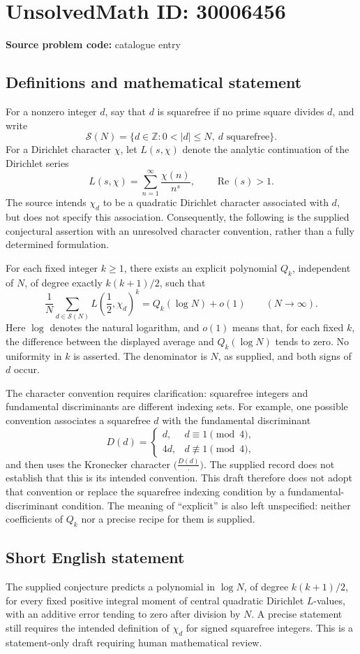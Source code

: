 \documentclass[11pt]{article}
\newcommand{\Z}{\mathbb{Z}}
\begin{document}
\section*{UnsolvedMath ID: 30006456}
\textbf{Source problem code:} catalogue entry
\subsection{Definitions and mathematical statement}
For a nonzero integer \(d\), say that \(d\) is squarefree if no prime square divides \(d\), and write
\[
\mathcal S(N)=\{d\in\Z:0<|d|\leq N,\ d\text{ squarefree}\}.
\]
For a Dirichlet character \(\chi\), let \(L(s,\chi)\) denote the analytic continuation of the Dirichlet series
\[
L(s,\chi)=\sum_{n=1}^{\infty}\frac{\chi(n)}{n^s},\qquad \operatorname{Re}(s)>1.
\]
The source intends \(\chi_d\) to be a quadratic Dirichlet character associated with \(d\), but does not specify this association. Consequently, the following is the supplied conjectural assertion with an unresolved character convention, rather than a fully determined formulation.

For each fixed integer \(k\geq1\), there exists an explicit polynomial \(Q_k\), independent of \(N\), of degree exactly \(k(k+1)/2\), such that
\[
\frac{1}{N}\sum_{d\in\mathcal S(N)}L\!\left(\frac12,\chi_d\right)^k
=Q_k(\log N)+o(1)
\qquad(N\to\infty).
\]
Here \(\log\) denotes the natural logarithm, and \(o(1)\) means that, for each fixed \(k\), the difference between the displayed average and \(Q_k(\log N)\) tends to zero. No uniformity in \(k\) is asserted. The denominator is \(N\), as supplied, and both signs of \(d\) occur.

The character convention requires clarification: squarefree integers and fundamental discriminants are different indexing sets. For example, one possible convention associates a squarefree \(d\) with the fundamental discriminant
\[
D(d)=\begin{cases}d,&d\equiv1\pmod4,\\4d,&d\not\equiv1\pmod4,\end{cases}
\]
and then uses the Kronecker character \(\bigl(\frac{D(d)}{\cdot}\bigr)\). The supplied record does not establish that this is its intended convention. This draft therefore does not adopt that convention or replace the squarefree indexing condition by a fundamental-discriminant condition. The meaning of ``explicit'' is also left unspecified: neither coefficients of \(Q_k\) nor a precise recipe for them is supplied.
\subsection{Short English statement}
The supplied conjecture predicts a polynomial in \(\log N\), of degree \(k(k+1)/2\), for every fixed positive integral moment of central quadratic Dirichlet \(L\)-values, with an additive error tending to zero after division by \(N\). A precise statement still requires the intended definition of \(\chi_d\) for signed squarefree integers. This is a statement-only draft requiring human mathematical review.
\end{document}

